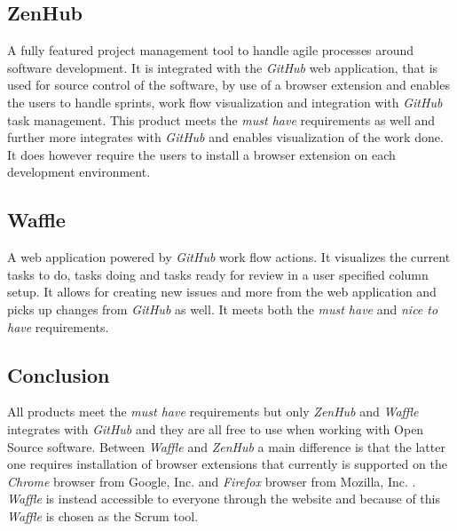 \subsection*{ZenHub}
A fully featured project management tool to handle agile processes around software development. 
It is integrated with the \textit{GitHub} web application, that is used for source control of the software, by use of a browser extension and enables the users to handle sprints, work flow visualization and integration with \textit{GitHub} task management. 
This product meets the \textit{must have} requirements as well and further more integrates with \textit{GitHub} and enables visualization of the work done.
It does however require the users to install a browser extension on each development environment.

\subsection*{Waffle}
A web application powered by \textit{GitHub} work flow actions. 
It visualizes the current tasks to do, tasks doing and tasks ready for review in a user specified column setup. 
It allows for creating new issues and more from the web application and picks up changes from \textit{GitHub} as well. 
It meets both the \textit{must have} and \textit{nice to have} requirements.

\subsection*{Conclusion}
All products meet the \textit{must have} requirements but only \textit{ZenHub} and \textit{Waffle} integrates with \textit{GitHub} and they are all free to use when working with Open Source software.
Between \textit{Waffle} and \textit{ZenHub} a main difference is that the latter one requires installation of browser extensions that currently is supported on the \textit{Chrome} browser from Google, Inc. and \textit{Firefox} browser from Mozilla, Inc.  \citep{preStudy:scrum:zenhub}.
\textit{Waffle} is instead accessible to everyone through the website and because of this \textit{Waffle} is chosen as the Scrum tool.
